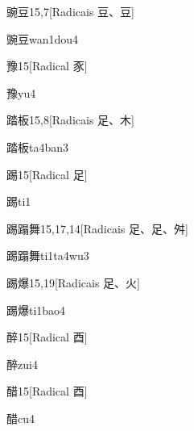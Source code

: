 \begin{entry}{豌豆}{15,7}[Radicais ⾖、⾖]
  \begin{phonetics}{豌豆}{wan1dou4}
  \end{phonetics}
\end{entry}

\begin{entry}{豫}{15}[Radical ⾗]
  \begin{phonetics}{豫}{yu4}
  \end{phonetics}
\end{entry}

\begin{entry}{踏板}{15,8}[Radicais ⾜、⽊]
  \begin{phonetics}{踏板}{ta4ban3}
  \end{phonetics}
\end{entry}

\begin{entry}{踢}{15}[Radical ⾜]
  \begin{phonetics}{踢}{ti1}
  \end{phonetics}
\end{entry}

\begin{entry}{踢蹋舞}{15,17,14}[Radicais ⾜、⾜、⾇]
  \begin{phonetics}{踢蹋舞}{ti1ta4wu3}
  \end{phonetics}
\end{entry}

\begin{entry}{踢爆}{15,19}[Radicais ⾜、⽕]
  \begin{phonetics}{踢爆}{ti1bao4}
  \end{phonetics}
\end{entry}

\begin{entry}{醉}{15}[Radical ⾣]
  \begin{phonetics}{醉}{zui4}
  \end{phonetics}
\end{entry}

\begin{entry}{醋}{15}[Radical ⾣]
  \begin{phonetics}{醋}{cu4}
  \end{phonetics}
\end{entry}

